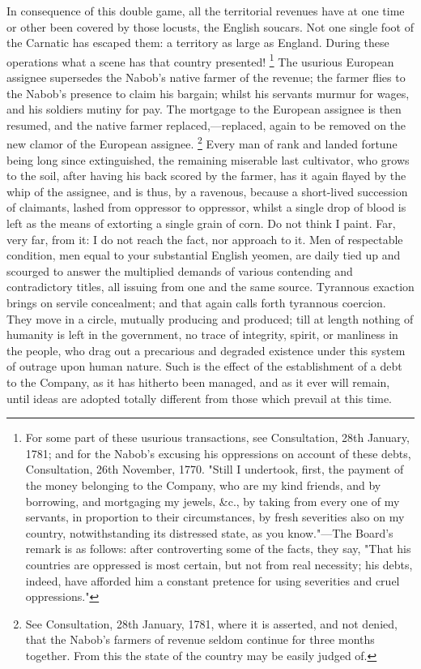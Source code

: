 In consequence of this double game, all the territorial revenues have at one time or other been covered by those locusts, the English soucars. Not one single foot of the Carnatic has escaped them: a territory as large as England. During these operations what a scene has that country presented!
\footnote{ For some part of these usurious transactions, see Consultation, 28th January, 1781; and for the Nabob's excusing his oppressions on account of these debts, Consultation, 26th November, 1770. "Still I undertook, first, the payment of the money belonging to the Company, who are my kind friends, and by borrowing, and mortgaging my jewels, \&c., by taking from every one of my servants, in proportion to their circumstances, by fresh severities also on my country, notwithstanding its distressed state, as you know."—The Board's remark is as follows: after controverting some of the facts, they say, "That his countries are oppressed is most certain, but not from real necessity; his debts, indeed, have afforded him a constant pretence for using severities and cruel oppressions."}
 The usurious European assignee supersedes the Nabob's native farmer of the revenue; the farmer flies to the Nabob's presence to claim his bargain; whilst his servants murmur for wages, and his soldiers mutiny for pay. The mortgage to the European assignee is then resumed, and the native farmer replaced,—replaced, again to be removed on the new clamor of the European assignee.
\footnote{ See Consultation, 28th January, 1781, where it is asserted, and not denied, that the Nabob's farmers of revenue seldom continue for three months together. From this the state of the country may be easily judged of.}
 Every man of rank and landed fortune being long since extinguished, the remaining miserable last cultivator, who grows to the soil, after having his back scored by the farmer, has it again flayed by the whip of the assignee, and is thus, by a ravenous, because a short-lived succession of claimants, lashed from oppressor to oppressor, whilst a single drop of blood is left as the means of extorting a single grain of corn. Do not think I paint. Far, very far, from it: I do not reach the fact, nor approach to it. Men of respectable condition, men equal to your substantial English yeomen, are daily tied up and scourged to answer the multiplied demands of various contending and contradictory titles, all issuing from one and the same source. Tyrannous exaction brings on servile concealment; and that again calls forth tyrannous coercion. They move in a circle, mutually producing and produced; till at length nothing of humanity is left in the government, no trace of integrity, spirit, or manliness in the people, who drag out a precarious and degraded existence under this system of outrage upon human nature. Such is the effect of the establishment of a debt to the Company, as it has hitherto been managed, and as it ever will remain, until ideas are adopted totally different from those which prevail at this time.

